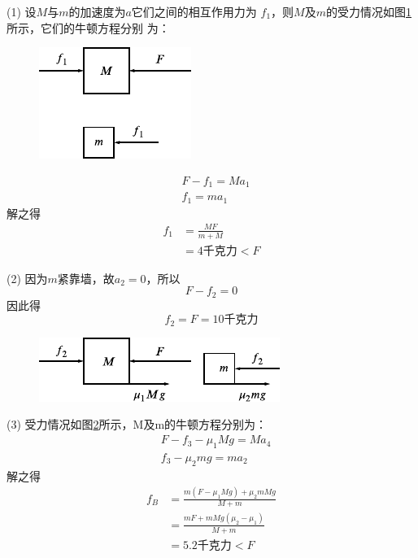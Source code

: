 \clearpage
\solution (1) 设$ M $与$ m $的加速度为$ a $它们之间的相互作用力为
$f_1$，则$ M $及$ m $的受力情况如图\ref{fig:03.09} 所示，它们的牛顿方程分别
为：
\begin{figure}
  \centering
  \includegraphics{figure/fig03.09}
  \caption{}
  \label{fig:03.09}
\end{figure}
\vspace{-1.4em}
\begin{align*}
   & F - f _ { 1 } = M a _ { 1 } \\
   & f _ { 1 } = m a _ { 1 }
\end{align*}
解之得
\begin{align*}
  f _ { 1 } & = \frac { M F } { m + M } \\
            & =4\text{千克力} < F
\end{align*}

(2) 因为$ m $紧靠墙，故$ a _ { 2 } = 0 $，所以
\begin{equation*}
  F - f _ { 2 } = 0
\end{equation*}
因此得
\begin{equation*}
  f _ { 2 } = F = 1 0 \text{千克力}
\end{equation*}

\begin{figure}
  \centering
  \includegraphics{figure/fig03.10}
  \caption{}
  \label{fig:03.10}
\end{figure}
(3) 受力情况如图\ref{fig:03.10}所示，M及m的牛顿方程分别为：
{\setlength{\mathindent}{2em}
\begin{align*}
   & F - f _ { 3 } - \mu _ { 1 } M g = M a _ { 4 } \\
   & f _ { 3 } - \mu _ { 2 } m g = m a _ { 2 }
\end{align*}}
解之得
\begin{align*}
  f _ { B } & = \frac { m \left( F - \mu _ { 1 } M g \right) + \mu _ { 2 } m M g } { M + m } \\
            & = \frac { m F + m M g \left( \mu _ { 2 } - \mu _ { 1 } \right) } { M + m }     \\
            & = 5.2 \text{千克力} < F
\end{align*}

